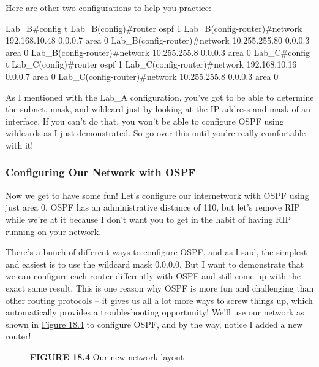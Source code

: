 Here are other two configurations to help you practice:

\begin{cli}
Lab_B#config t
Lab_B(config)#router ospf 1
Lab_B(config-router)#network 192.168.10.48 0.0.0.7 area 0
Lab_B(config-router)#network 10.255.255.80 0.0.0.3 area 0
Lab_B(config-router)#network 10.255.255.8 0.0.0.3 area 0
Lab_C#config t
Lab_C(config)#router ospf 1
Lab_C(config-router)#network 192.168.10.16 0.0.0.7 area 0
Lab_C(config-router)#network 10.255.255.8 0.0.0.3 area 0
\end{cli}

As I mentioned with the Lab\_A configuration, you've got to be able to
determine the subnet, mask, and wildcard just by looking at the IP
address and mask of an interface. If you can't do that, you won't be
able to configure OSPF using wildcards as I just demonstrated. So go
over this until you're really comfortable with it!

\subsubsection[Configuring Our Network with
OSPF]{\texorpdfstring{\protect\hypertarget{c18.xhtmlux5cux23c18-sec-8}{}{}Configuring
Our Network with OSPF}{Configuring Our Network with OSPF}}

Now we get to have some fun! Let's configure our internetwork with OSPF
using just area 0. OSPF has an administrative distance of 110, but let's
remove RIP while we're at it because I don't want you to get in the
habit of having RIP running on your network.

There's a bunch of different ways to configure OSPF, and as I said, the
simplest and easiest is to use the wildcard mask 0.0.0.0. But I want to
demonstrate that we can configure each router differently with OSPF and
still come up with the exact same result. This is one reason why OSPF is
more fun and challenging than other routing protocols -- it gives us all
a lot more ways to screw things up, which automatically provides
\protect\hypertarget{c18.xhtmlux5cux23Page_758}{}{}a troubleshooting
opportunity! We'll use our network as shown in
\protect\hyperlink{c18.xhtmlux5cux23figure18-4}{Figure 18.4} to
configure OSPF, and by the way, notice I added a new router!

\begin{figure}
\centering
\caption{{\protect\hyperlink{c18.xhtmlux5cux23figureanchor18-4}{\textbf{FIGURE
18.4}} Our new network layout}}
\end{figure}

